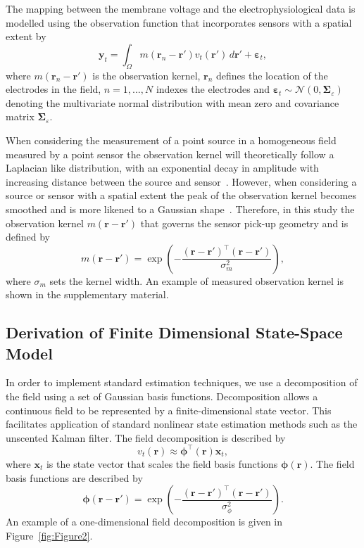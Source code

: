 \documentclass[12pt]{iopart}
\begin{document}
The mapping between the membrane voltage and the electrophysiological data is modelled using the observation function that incorporates sensors with a spatial extent by
\begin{equation}
    \label{eq:ObservationEquation}
	\mathbf{y}_t =
	\int_{\Omega}{
	    m\left(\mathbf{r}_n-\mathbf{r}'\right)v_t\left(\mathbf{r}'\right)
	\, d\mathbf{r}'} + 
	\boldsymbol{\varepsilon}_t, 
\end{equation}
where $m\left(\mathbf{r}_n-\mathbf{r}'\right)$ is the observation kernel, $\mathbf{r}_n$ defines the location of the electrodes in the field, $n=1,...,N$ indexes the electrodes and $\boldsymbol{\varepsilon}_t \sim \mathcal{N}\left(0,\boldsymbol{\Sigma}_{\varepsilon}\right)$ denoting the multivariate normal distribution with mean zero and covariance matrix $\boldsymbol{\Sigma}_{\varepsilon}$. 

When considering the measurement of a point source in a homogeneous field measured by a point sensor the observation kernel will theoretically follow a Laplacian like distribution, with an exponential decay in amplitude with increasing distance between the source and sensor~\cite{Jackson1999}. However, when considering a source or sensor with a spatial extent the peak of the observation kernel becomes smoothed and is more likened to a Gaussian shape~\cite{Jackson1999}. Therefore, in this study the observation kernel $m(\mathbf{r}-\mathbf{r}')$ that governs the sensor pick-up geometry and is defined by 
\begin{equation}
	m\left(\mathbf{r}-\mathbf{r}'\right) = \exp{\left(-\frac{(\mathbf{r}-\mathbf{r}')^\top(\mathbf{r}-\mathbf{r}')}{\sigma_m^2}\right)},
\end{equation}
where $\sigma_m$ sets the kernel width. An example of measured observation kernel is shown in the supplementary material.

\subsection{Derivation of Finite Dimensional State-Space Model}\label{Sect:ReducedModelDerivation}
In order to implement standard estimation techniques, we use a decomposition of the field using a set of Gaussian basis functions. Decomposition allows a continuous field to be represented by a finite-dimensional state vector. This facilitates application of standard nonlinear state estimation methods such as the unscented Kalman filter. The field decomposition is described by 
\begin{equation}
	\label{DefFieldDecomp} v_t\left(\mathbf{r}\right) \approx \boldsymbol{\phi}^{\top}\left(\mathbf{r}\right) \mathbf{x}_t, 
\end{equation}
where $\mathbf{x}_t$ is the state vector that scales the field basis functions $\mathbf{\boldsymbol{\phi}}(\mathbf{r})$. The field basis functions are described by
\begin{equation}\label{eq:FieldBasisFunction}
	\boldsymbol\phi\left(\mathbf{r}-\mathbf{r}'\right) =
\exp{\left(-\frac{(\mathbf{r}-\mathbf{r}')^\top(\mathbf{r}-\mathbf{r}')}{\sigma_{\phi}^2}\right)}. 
\end{equation}
An example of a one-dimensional field decomposition is given in Figure~\ref{fig:Figure2}.
\end{document}
